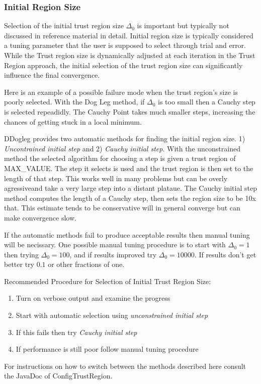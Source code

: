 \documentclass[peerreview,compsoc,onecolumn]{IEEEtran}
\newenvironment{enumargin}[1]{\begin{enumerate}[leftmargin=#1\textwidth , rightmargin=#1\textwidth]}{\end{enumerate}}
\begin{document}
\subsubsection{Initial Region Size} 
\label{section:init_region_size}

Selection of the initial trust region size $\Delta_0$ is important but typically not discussed in reference material \cite{fletcher1987,numopt2006,IMM2004} in detail. Initial region size is typically considered a tuning parameter that the user is supposed to select through trial and error. While the Trust region size is dynamically adjusted at each iteration in the Trust Region approach, the initial selection of the trust region size can significantly influence the final convergence.

Here is an example of a possible failure mode when the trust region's size is poorly selected. With the Dog Leg method, if $\Delta_0$ is too small then a Cauchy step is selected repeadidly. The Cauchy Point takes much smaller steps, increasing the chances of getting stuck in a local minimum.

DDogleg provides two automatic methods for finding the initial region size. 1) \emph{Uncontrained initial step} and 2) \emph{Cauchy initial step}. With the unconstrained method the selected algorithm for choosing a step is given a trust region of MAX\_VALUE. The step it selects is used and the trust region is then set to the length of that step. This works well in many problems but can be overly agressiveand take a very large step into a distant plataue. The Cauchy initial step method computes the length of a Cauchy step, then sets the region size to be 10x that. This estimate tends to be conservative will in general converge but can make convergence slow.

If the automatic methods fail to produce acceptable results then manual tuning will be necissary. One possible manual tuning procedure is to start with $\Delta_0=1$ then trying $\Delta_0=100$, and if results improved try $\Delta_0=10000$. If results don't get better try $0.1$ or other fractions of one.

Recommended Procedure for Selection of Initial Trust Region Size:
\begin{enumargin}{0.2}
\item Turn on verbose output and examine the progress
\item Start with automatic selection using \emph{unconstrained initial step}
\item If this fails then try \emph{Cauchy initial step}
\item If performance is still poor follow manual tuning procedure
\end{enumargin}
For instructions on how to switch between the methods described here consult the JavaDoc of ConfigTrustRegion.
\end{document}
